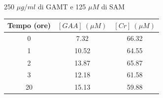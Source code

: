 \begin{frame}
\begin{columns}[t]
\begin{block}{250 $\mu g/ml$ di GAMT e 125 $\mu M$ di SAM}
			\resizebox{\textwidth}{!} {
				\begin{tabular}{| c | c | c |}
					\hline
					Tempo (ore) & $[GAA]\ (\mu M)$ & $[Cr]\ (\mu M)$ \\
					\hline
					0 & 7.32 & 66.32\\
					\hline
					1 & 10.52 & 64.55\\
					\hline
					2 & 13.87 & 65.87\\
					\hline
					3 & 12.18 & 61.58\\
					\hline
					20 & 15.13 & 59.88\\
					\hline
				\end{tabular}
			}
		\end{block}
		
	\end{columns}
	
\end{frame}

